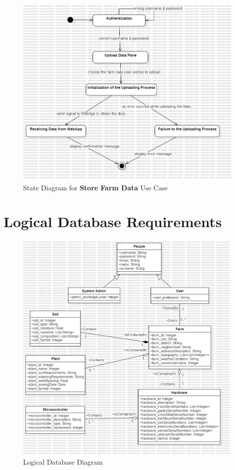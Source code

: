 \begin{figure}[htbp]
  \centering
  \includegraphics[width=1\linewidth]{Figures/store_farm_data_state_diagram.jpg}
  \caption{State Diagram for \textbf{Store Farm Data} Use Case}
  \label{StateDiagram}
\end{figure}

\newpage

\section{Logical Database Requirements}
\begin{figure}[htbp]
        \centering
        \includegraphics[width=1\linewidth]{Figures/logical_database_diagram.jpg}
        \caption{Logical Database Diagram}
        \label{LogicalDatabaseDiagram}
\end{figure}


